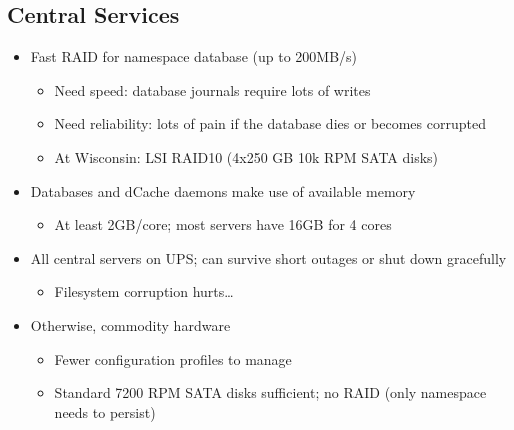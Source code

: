 \documentclass{beamer}
\begin{document}
\subsection{Central Services}
\begin{frame}
\begin{itemize}
	\item Fast RAID for namespace database (up to 200MB/s)
	\begin{itemize}
		\item Need speed: database journals require lots of writes
		\item Need reliability: lots of pain if the database dies or becomes corrupted
		\item At Wisconsin: LSI RAID10 (4x250 GB 10k RPM SATA disks)
	\end{itemize}
	\item Databases and dCache daemons make use of available memory
	\begin{itemize}
		\item At least 2GB/core; most servers have 16GB for 4 cores
	\end{itemize}
	\item All central servers on UPS; can survive short outages or shut down gracefully
	\begin{itemize}
		\item Filesystem corruption hurts\ldots{}
	\end{itemize}
	\item Otherwise, commodity hardware
	\begin{itemize}
		\item Fewer configuration profiles to manage
		\item Standard 7200 RPM SATA disks sufficient; no RAID (only namespace needs to persist)
	\end{itemize}
\end{itemize}
\end{frame}
\end{document}
